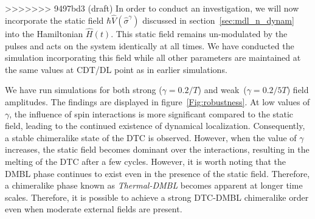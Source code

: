 \documentclass[12pt]{iopart}
\begin{document}
>>>>>>> 9497bd3 (draft)
In order to conduct an investigation, we will now incorporate the static field $\hbar\hat{V}(\hat{\sigma}^{\gamma})$ discussed in section~\ref{sec:mdl_n_dynam} into the Hamiltonian $\hat{H}(t)$. This static field remains un-modulated by the pulses and acts on the system identically at all times. We have conducted the simulation incorporating this field while all other parameters are maintained at the same values at CDT/DL point as in earlier simulations. 

We have run simulations for both strong ($\gamma=0.2/T$) and weak ($ \gamma= 0.2/5T$) field amplitudes. The findings are displayed in figure~\ref{Fig:robustness}. At low values of $\gamma$, the influence of spin interactions is more significant compared to the static field, leading to the continued existence of dynamical localization. Consequently, a stable chimeralike state of the DTC is observed. However, when the value of $\gamma$ increases, the static field becomes dominant over the interactions, resulting in the melting of the DTC after a few cycles. However, it is worth noting that the DMBL phase continues to exist even in the presence of the static field. Therefore, a chimeralike phase known as \textit{Thermal-DMBL} becomes apparent at longer time scales. Therefore, it is possible to achieve a strong DTC-DMBL chimeralike order even when moderate external fields are present.
	
\end{document}
